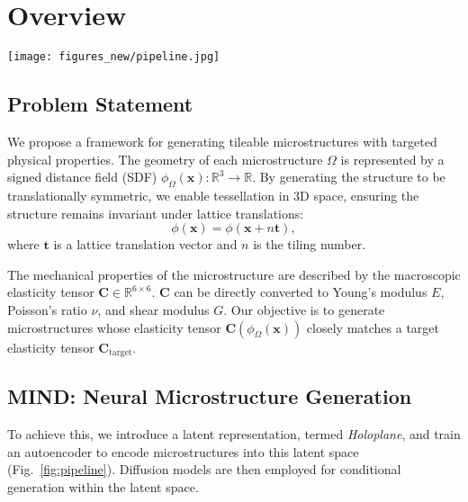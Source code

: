 \section{Overview}
\label{sec:overview}

\begin{figure*}[ht]
    \centering
    \texttt{[image: figures\_new/pipeline.jpg]}
    \caption{Pipeline of the MIND. 
    (a) We explicitly encode the microstructural symmetry in voxel space, leveraging the inherent symmetry to ensure tilability.
    (b) A combination of distance and displacement fields integrates physical priors into the implicit fields, enabling a hybrid neural representation, Holoplane.
    (c) Holoplane can be conditionally generated using a diffusion model, yielding diverse microstructural demands.
    (d) We apply this process to heterogeneous design, generating seamlessly fitting, 3D-printable structures.}
    \label{fig:pipeline}
\end{figure*}


\subsection{Problem Statement}
We propose a framework for generating tileable microstructures with targeted physical properties.
The geometry of each microstructure $\Omega$ is represented by a signed distance field (SDF) $\phi_{\Omega}(\mathbf{x}): \mathbb{R}^3 \to \mathbb{R}$. 
By generating the structure to be translationally symmetric, we enable tessellation in 3D space, ensuring the structure remains invariant under lattice translations: 
\begin{equation}
    \phi(\mathbf{x})=\phi(\mathbf{x} + n\mathbf{t}),
\end{equation}
where $\mathbf{t}$ is a lattice translation vector and $n$ is the tiling number.

The mechanical properties of the microstructure are described by the macroscopic elasticity tensor $\mathbf{C} \in \mathbb{R}^{6\times6}$. 
$\mathbf{C}$ can be directly converted to Young's modulus $E$, Poisson's ratio $\nu$, and shear modulus $G$.
Our objective is to generate microstructures whose elasticity tensor $\mathbf{C}(\phi_{\Omega}(\mathbf{x}))$ closely matches a target elasticity tensor $\mathbf{C}_{\text{target}}$.

\subsection{MIND: Neural Microstructure Generation}
To achieve this, we introduce a latent representation, termed \textit{Holoplane}, and train an autoencoder to encode microstructures into this latent space (Fig.~\ref{fig:pipeline}). 
Diffusion models are then employed for conditional generation within the latent space.


